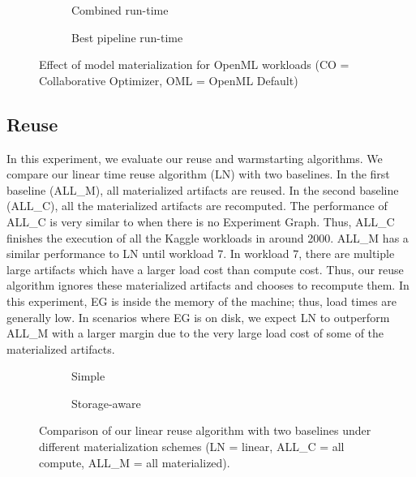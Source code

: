 \begin{figure}
\begin{subfigure}[b]{0.5\linewidth}
\centering
 \resizebox{\columnwidth}{!}{%
%
}
\caption{Combined run-time}
\end{subfigure}%
\begin{subfigure}[b]{0.5\linewidth}
\centering
 \resizebox{\columnwidth}{!}{%
%
}
\caption{Best pipeline run-time}
\end{subfigure}
\caption{Effect of model materialization for OpenML workloads (CO = Collaborative Optimizer, OML = OpenML Default)}
\label{exp-model-materialization}
\end{figure}

\subsection{Reuse}
In this experiment, we evaluate our reuse and warmstarting algorithms. 
We compare our linear time reuse algorithm (LN) with two baselines.
In the first baseline (ALL\_M), all materialized artifacts are reused.
In the second baseline (ALL\_C), all the materialized artifacts are recomputed.
The performance of ALL\_C is very similar to when there is no Experiment Graph.
Thus, ALL\_C finishes the execution of all the Kaggle workloads in around 2000.
ALL\_M has a similar performance to LN until workload 7.
In workload 7, there are multiple large artifacts which have a larger load cost than compute cost.
Thus, our reuse algorithm ignores these materialized artifacts and chooses to recompute them.
In this experiment, EG is inside the memory of the machine; thus, load times are generally low.
In scenarios where EG is on disk, we expect LN to outperform ALL\_M with a larger margin due to the very large load cost of some of the materialized artifacts.
\begin{figure}
\begin{subfigure}[b]{0.5\linewidth}
\centering
 \resizebox{\columnwidth}{!}{%
%
}
\caption{Simple}
\end{subfigure}%
\begin{subfigure}[b]{0.5\linewidth}
\centering
 \resizebox{\columnwidth}{!}{%
%
}

\caption{Storage-aware}
\end{subfigure}
\caption{Comparison of our linear reuse algorithm with two baselines under different materialization schemes (LN = linear, ALL\_C = all compute, ALL\_M = all materialized). }
\end{figure}

